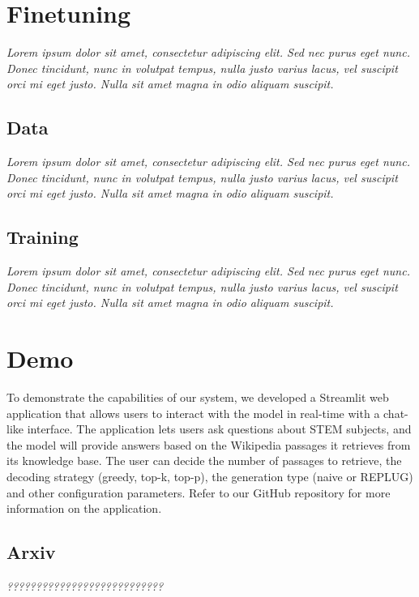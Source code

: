 \documentclass[11pt]{article}
\begin{document}
\section{Finetuning}

\textit{Lorem ipsum dolor sit amet, consectetur adipiscing elit. Sed nec purus eget
nunc. Donec tincidunt, nunc in volutpat tempus, nulla justo varius lacus, vel
suscipit orci mi eget justo. Nulla sit amet magna in odio aliquam suscipit.}

\subsection{Data}

\textit{Lorem ipsum dolor sit amet, consectetur adipiscing elit. Sed nec purus eget
nunc. Donec tincidunt, nunc in volutpat tempus, nulla justo varius lacus, vel
suscipit orci mi eget justo. Nulla sit amet magna in odio aliquam suscipit.}

\subsection{Training}

\textit{Lorem ipsum dolor sit amet, consectetur adipiscing elit. Sed nec purus eget
nunc. Donec tincidunt, nunc in volutpat tempus, nulla justo varius lacus, vel
suscipit orci mi eget justo. Nulla sit amet magna in odio aliquam suscipit.}

\section{Demo}

To demonstrate the capabilities of our system, we developed a Streamlit web application
that allows users to interact with the model in real-time with a chat-like interface. 
The application lets users ask questions about STEM subjects, and the model will provide answers 
based on the Wikipedia passages it retrieves from its knowledge base. 
The user can decide the number of passages to retrieve, the decoding strategy (greedy, top-k, top-p), 
the generation type (naive or REPLUG) and other configuration parameters.
Refer to our GitHub repository for more information on the application.

\subsection{Arxiv}

\textit{???????????????????????????}
\end{document}

